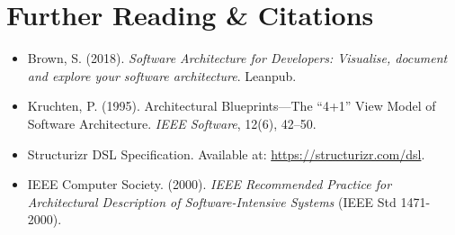 \section{Further Reading \protect\& Citations}
\begin{itemize}[leftmargin=18pt]
  \item Brown, S. (2018). \textit{Software Architecture for Developers: Visualise, document and explore your software architecture}. Leanpub.
  \item Kruchten, P. (1995). Architectural Blueprints---The ``4+1'' View Model of Software Architecture. \textit{IEEE Software}, 12(6), 42--50.
  \item Structurizr DSL Specification. Available at: \url{https://structurizr.com/dsl}.
  \item IEEE Computer Society. (2000). \textit{IEEE Recommended Practice for Architectural Description of Software-Intensive Systems} (IEEE Std 1471-2000).
\end{itemize}

